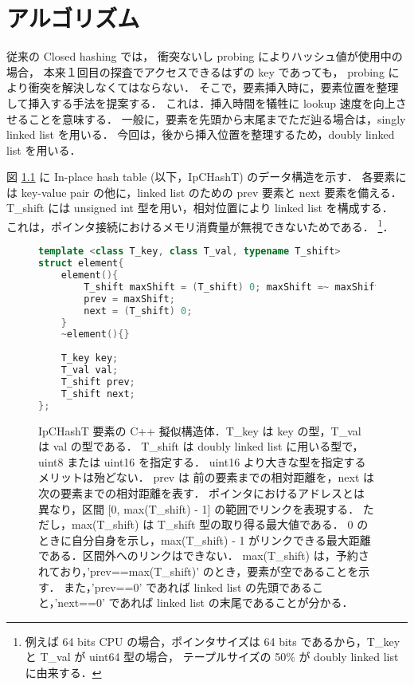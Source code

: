 \chapter{アルゴリズム}
\label{chap_Algorism}

従来の Closed hashing では，
衝突ないし probing によりハッシュ値が使用中の場合，
本来１回目の探査でアクセスできるはずの key であっても，
probing により衝突を解決しなくてはならない．
そこで，要素挿入時に，要素位置を整理して挿入する手法を提案する．
これは．挿入時間を犠牲に lookup 速度を向上させることを意味する．
一般に，要素を先頭から末尾までただ辿る場合は，singly linked list を用いる．
今回は，後から挿入位置を整理するため，doubly linked list を用いる．

図 \ref{fig_IpCHashT_struct} に In-place hash table (以下，IpCHashT) のデータ構造を示す．
各要素には key-value pair の他に，linked list のための prev 要素と next 要素を備える．
T\_shift には unsigned int 型を用い，相対位置により linked list を構成する．
これは，ポインタ接続におけるメモリ消費量が無視できないためである．
\footnote{例えば 64 bits CPU の場合，ポインタサイズは 64 bits であるから，T\_key と T\_val が uint64 型の場合，
テープルサイズの 50\% が doubly linked list に由来する．}．

\begin{figure}[h] %
\begin{lstlisting}[language=C++]
template <class T_key, class T_val, typename T_shift>
struct element{
	element(){
		T_shift maxShift = (T_shift) 0; maxShift =~ maxShift;
		prev = maxShift;
		next = (T_shift) 0;
	}
	~element(){}
	
	T_key key;
	T_val val;
	T_shift prev;
	T_shift next;
};
\end{lstlisting}
\caption{
  IpCHashT 要素の C++ 擬似構造体．T\_key は key の型，T\_val は val の型である．
  T\_shift は doubly linked list に用いる型で，uint8 または uint16 を指定する．
  uint16 より大きな型を指定するメリットは殆どない．
  prev は 前の要素までの相対距離を，next は 次の要素までの相対距離を表す．
  ポインタにおけるアドレスとは異なり，区間 [0, max(T\_shift) - 1] の範囲でリンクを表現する．
  ただし，max(T\_shift) は T\_shift 型の取り得る最大値である．
  0 のときに自分自身を示し，max(T\_shift) - 1 がリンクできる最大距離である．区間外へのリンクはできない．
  max(T\_shift) は，予約されており，'prev==max(T\_shift)' のとき，要素が空であることを示す．
  また，'prev==0' であれば linked list の先頭であること，'next==0' であれば linked list の末尾であることが分かる．
}
\label{fig_IpCHashT_struct}
\end{figure}


